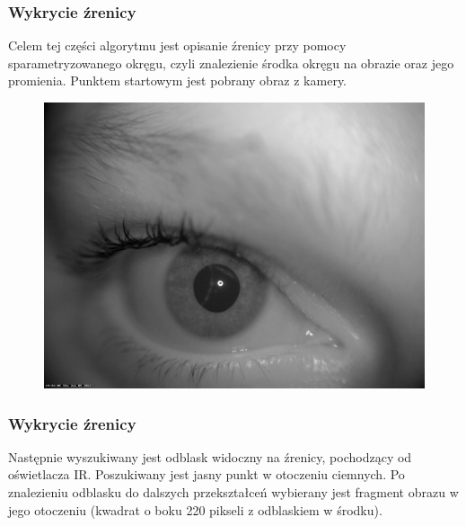 \documentclass{beamer}
\begin{document}
\begin{frame}
\frametitle{Wykrycie źrenicy}
Celem tej części algorytmu jest opisanie źrenicy przy pomocy sparametryzowanego okręgu, czyli znalezienie środka okręgu na obrazie oraz jego promienia. Punktem startowym jest pobrany obraz z kamery.
\begin{figure}
\begin{center}
\includegraphics[scale=0.13]{szarosc.jpg}
\end{center}
\end{figure}
\end{frame}


\begin{frame}
\frametitle{Wykrycie źrenicy}
Następnie wyszukiwany jest odblask widoczny na źrenicy, pochodzący od oświetlacza IR. Poszukiwany jest jasny punkt w otoczeniu ciemnych. Po znalezieniu odblasku do dalszych przekształceń wybierany jest fragment obrazu w jego otoczeniu (kwadrat o boku 220 pikseli z odblaskiem w środku).
\end{frame}

\end{document}
